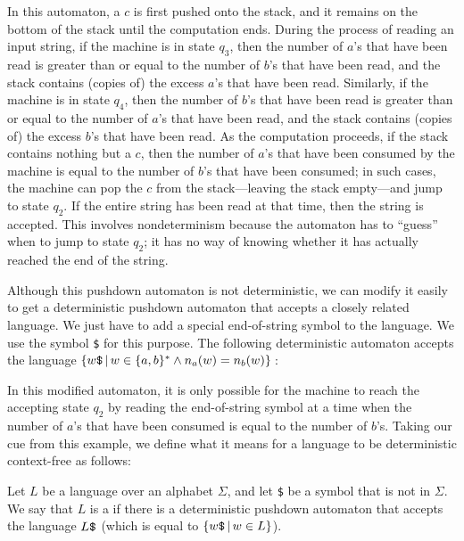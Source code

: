 \medskip
\centerline{}
\smallskip

\noindent In this automaton, a $c$ is first pushed onto the stack,
and it remains on the bottom of the stack until the computation ends.
During the process of reading an input string,
if the machine is in state $q_3$, then the
number of $a$'s that have been read is greater than or equal to
the number of $b$'s that have been read, and the stack contains
(copies of) the excess $a$'s that have been read.  Similarly,
if the machine is in state $q_4$, then the
number of $b$'s that have been read is greater than or equal to
the number of $a$'s that have been read, and the stack contains
(copies of) the excess $b$'s that have been read.
As the computation proceeds, if the stack contains nothing but a $c$,
then the number of $a$'s that have been consumed by the machine
is equal to the number of $b$'s that have been consumed; in such
cases, the machine can pop the $c$ from the stack---leaving the
stack empty---and jump to state $q_2$.  If the entire string has
been read at that time, then the string is accepted.  This involves
nondeterminism because the automaton has to ``guess'' when to
jump to state $q_2$; it has no way of knowing whether it has
actually reached the end of the string.

Although this pushdown automaton is not deterministic, we can
modify it easily to get a deterministic pushdown automaton that
accepts a closely related language.  We just have to add a
special end-of-string symbol to the language.  We use the
symbol {\tt\$} for this purpose.  The following deterministic
automaton accepts the language $\{w\hbox{\tt\$}\,|\, w\in \{a,b\}^*\wedge n_a(w)=n_b(w)\}\,$:

\medskip
\centerline{}
\smallskip

\noindent In this modified automaton, it is only possible for the
machine to reach the accepting state $q_2$ by reading the end-of-string
symbol at a time when the number of $a$'s that have been consumed is equal
to the number of $b$'s.  Taking our cue from this example, we define 
what it means for a language to be deterministic context-free as follows:

\begin{definition}
Let $L$ be a language over an alphabet $\Sigma$, and let {\tt\$} be
a symbol that is not in $\Sigma$.  We say that $L$ is a 
if there is a deterministic pushdown automaton
that accepts the language $L\hbox{\tt\$}$ (which is equal to 
$\{w\hbox{\tt\$}\,|\, w\in L\}$).
\end{definition}

